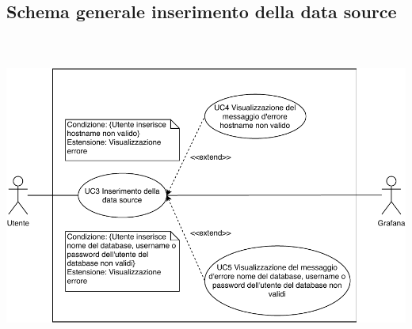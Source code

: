 \subsection{Schema generale inserimento della data source}
\hspace*{-0.5cm}\includegraphics[width=400pt, height=300pt]{img/schema_generale_uc3.pdf}
